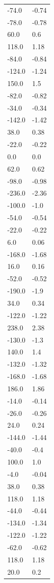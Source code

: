 \begin{longtable}{ll}
-74.0 & -0.74 \\
-78.0 & -0.78 \\
60.0 & 0.6 \\
118.0 & 1.18 \\
-84.0 & -0.84 \\
-124.0 & -1.24 \\
150.0 & 1.5 \\
-82.0 & -0.82 \\
-34.0 & -0.34 \\
-142.0 & -1.42 \\
38.0 & 0.38 \\
-22.0 & -0.22 \\
0.0 & 0.0 \\
62.0 & 0.62 \\
-98.0 & -0.98 \\
-236.0 & -2.36 \\
-100.0 & -1.0 \\
-54.0 & -0.54 \\
-22.0 & -0.22 \\
6.0 & 0.06 \\
-168.0 & -1.68 \\
16.0 & 0.16 \\
-52.0 & -0.52 \\
-190.0 & -1.9 \\
34.0 & 0.34 \\
-122.0 & -1.22 \\
238.0 & 2.38 \\
-130.0 & -1.3 \\
140.0 & 1.4 \\
-132.0 & -1.32 \\
-168.0 & -1.68 \\
186.0 & 1.86 \\
-14.0 & -0.14 \\
-26.0 & -0.26 \\
24.0 & 0.24 \\
-144.0 & -1.44 \\
-40.0 & -0.4 \\
100.0 & 1.0 \\
-4.0 & -0.04 \\
38.0 & 0.38 \\
118.0 & 1.18 \\
-44.0 & -0.44 \\
-134.0 & -1.34 \\
-122.0 & -1.22 \\
-62.0 & -0.62 \\
118.0 & 1.18 \\
20.0 & 0.2 \\

\end{longtable}

